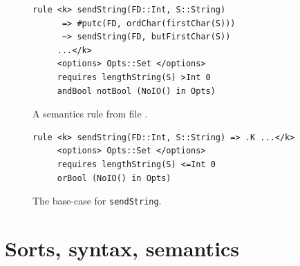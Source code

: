 \documentclass[nolot,nolof,nocover,printed]{fithesis3}
\begin{document}
\begin{figure}[hp]
\begin{lstlisting}
rule <k> sendString(FD::Int, S::String)
      => #putc(FD, ordChar(firstChar(S)))
      ~> sendString(FD, butFirstChar(S))
     ...</k>
     <options> Opts::Set </options>
     requires lengthString(S) >Int 0
     andBool notBool (NoIO() in Opts)
\end{lstlisting}
\caption{A semantics rule from file \protect{}.}
\label{fig:exampleCSemanticsRule}
\end{figure}

\begin{figure}[hp]
\begin{lstlisting}
rule <k> sendString(FD::Int, S::String) => .K ...</k>
     <options> Opts::Set </options>
     requires lengthString(S) <=Int 0
     orBool (NoIO() in Opts)
\end{lstlisting}
\caption{The base-case for \texttt{sendString}.}
\label{fig:exampleCSemanticsRule2}
\end{figure}












\section{Sorts, syntax, semantics}
\end{document}
